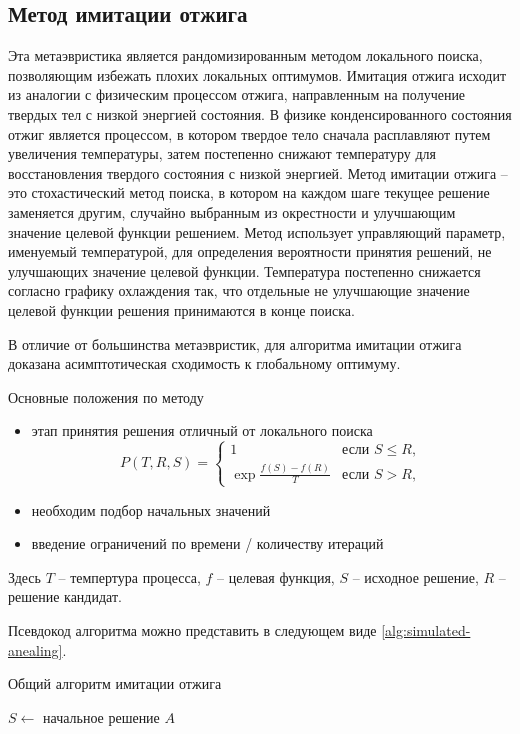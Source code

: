 \subsection{Метод имитации отжига}
Эта метаэвристика является рандомизированным методом локального поиска, позволяющим избежать плохих локальных 
оптимумов. Имитация отжига исходит из аналогии с физическим процессом отжига, направленным на получение 
твердых тел с низкой энергией состояния. В физике конденсированного состояния отжиг является процессом, в 
котором твердое тело сначала расплавляют путем увеличения температуры, затем постепенно снижают температуру
для восстановления твердого состояния с низкой энергией. Метод имитации отжига -- это стохастический метод 
поиска, в котором на каждом шаге текущее решение заменяется другим, случайно выбранным из окрестности и 
улучшающим значение целевой функции решением. Метод использует управляющий параметр, именуемый температурой, 
для определения вероятности принятия решений, не улучшающих значение целевой функции. Температура постепенно 
снижается согласно графику охлаждения так, что отдельные не улучшающие значение целевой функции решения 
принимаются в конце поиска.

В отличие от большинства метаэвристик, для алгоритма имитации отжига доказана асимптотическая сходимость к 
глобальному оптимуму. 

Основные положения по методу
\begin{itemize}
    \item этап принятия решения отличный от локального поиска
    \[
        P(T, R, S)= \left\{\begin{array}{cc}
            1                       & \text{если } S \leq R, \\
            \exp\frac{f(S)-f(R)}{T} & \text{если } S > R,
        \end{array}\right.
    \]
    \item необходим подбор начальных значений
    \item введение ограничений по времени / количеству итераций
\end{itemize}

Здесь \( T \) -- темпертура процесса, \( f \) -- целевая функция, \( S \) -- исходное решение, 
\( R \) -- решение кандидат.

Псевдокод алгоритма можно представить в следующем виде \ref{alg:simulated-anealing}.

\newpage

\begin{algorithm}[ht!]
    \caption{Общий алгоритм имитации отжига}
    \( S \leftarrow \) начальное решение \( A \)\;
    \label{alg:simulated-anealing}
\end{algorithm}


